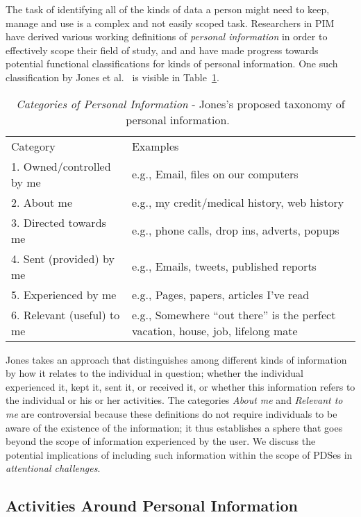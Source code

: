 \documentclass[graybox]{svmult}
\begin{document}
The task of identifying all of the kinds of data a person might need to keep, manage and use is a complex and not easily scoped task.  Researchers in PIM have derived various working definitions of \emph{personal information} in order to effectively scope their field of study, and and have made progress towards potential functional classifications for kinds of personal information. One such classification by Jones et al.~\cite{kftf} is visible in Table~\ref{fig:jonestype}.

\begin{table}
\begin{tabular}{p{4cm} p{8cm}}
Category & Examples \\
1. Owned/controlled by me & e.g., Email, files on our computers  \\
2. About me	& e.g., my credit/medical history, web history \\
3. Directed towards me & e.g., phone calls, drop ins, adverts, popups \\
4. Sent (provided) by me & e.g.,  Emails, tweets, published reports  \\
5. Experienced by me & e.g.,  Pages, papers, articles I’ve read \\
6. Relevant (useful) to me	& e.g.,  Somewhere ``out there'' is the perfect vacation, house, job, lifelong mate \\
\end{tabular}
\caption{\emph{Categories of Personal Information} - Jones's proposed taxonomy of personal information.~\cite{kftf}}
\label{fig:jonestype}
\end{table}

Jones takes an approach that distinguishes among different kinds of information by how it relates to the individual in question; whether the individual experienced it, kept it, sent it, or received it, or whether this information refers to the individual or his or her activities.  The categories \emph{About me} and \emph{Relevant to me} are controversial because these definitions do not require individuals to be aware of the existence of the information; it thus establishes a sphere that goes beyond the scope of information experienced by the user.  We discuss the potential implications of including such information within the scope of PDSes in \emph{attentional challenges}. 


\subsection{Activities Around Personal Information}
\end{document}
